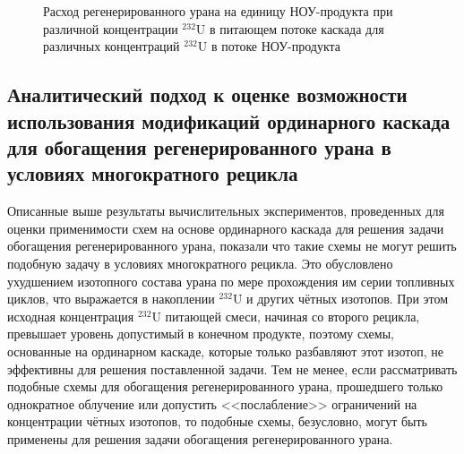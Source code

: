 \begin{figure}[ht]
  \caption{Расход регенерированного урана на единицу НОУ-продукта  при различной концентрации $^{232}$U в питающем потоке каскада для различных концентраций $^{232}$U в потоке НОУ-продукта}\label{sc3_1.second}
\end{figure}



\subsection{Аналитический подход к оценке возможности использования модификаций ординарного каскада для обогащения регенерированного урана в условиях многократного рецикла}

Описанные выше результаты вычислительных экспериментов, проведенных для оценки применимости схем на основе ординарного каскада для решения задачи обогащения регенерированного урана, показали что такие схемы не могут решить подобную задачу в условиях  многократного рецикла. Это обусловлено ухудшением изотопного состава урана по мере прохождения им серии топливных циклов, что выражается в накоплении $^{232}$U и других чётных изотопов. При этом исходная концентрация $^{232}$U питающей смеси, начиная со второго рецикла, превышает уровень допустимый в конечном продукте, поэтому схемы, основанные на ординарном каскаде, которые только разбавляют этот изотоп, не эффективны для решения поставленной задачи. Тем не менее, если рассматривать подобные схемы для обогащения регенерированного урана, прошедшего только однократное облучение или допустить <<послабление>> ограничений на концентрации чётных изотопов, то подобные схемы, безусловно, могут быть применены для решения задачи обогащения регенерированного урана.

